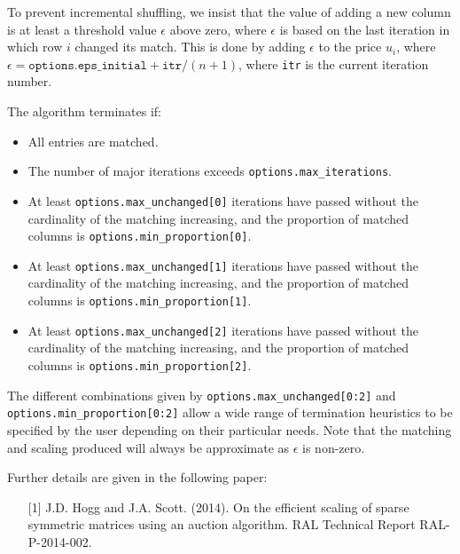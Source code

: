 To prevent incremental shuffling, we insist that the value of
adding a new column is at least a threshold value $\epsilon$ above zero, where
$\epsilon$ is based on the last iteration in which row $i$ changed its match.
This is done by adding $\epsilon$ to the price $u_i$, where $\epsilon = \texttt{options.eps\_initial} + \texttt{itr} / (n+1)$, where \texttt{itr} is the current iteration number.

The algorithm terminates if:
\begin{itemize}
   \item All entries are matched.
   \item The number of major iterations exceeds \texttt{options.max\_iterations}.
   \item At least \texttt{options.max\_unchanged[0]} iterations have passed without the cardinality of the matching increasing, and the proportion of matched columns is \texttt{options.min\_proportion[0]}.
   \item At least \texttt{options.max\_unchanged[1]} iterations have passed without the cardinality of the matching increasing, and the proportion of matched columns is \texttt{options.min\_proportion[1]}.
   \item At least \texttt{options.max\_unchanged[2]} iterations have passed without the cardinality of the matching increasing, and the proportion of matched columns is \texttt{options.min\_proportion[2]}.
\end{itemize}

The different combinations given by \texttt{options.max\_unchanged[0:2]}
and
\texttt{options.min\_proportion[0:2]} allow a wide range of termination
heuristics to be specified by the user depending on their particular needs. Note
that the matching and scaling produced will always be approximate as
$\epsilon$ is non-zero.

\vspace{0.2cm}
\noindent
Further details are given in the following paper:
\vspace{-0.2cm}
\begin{itemize}
   \item[{[1]}] J.D. Hogg and J.A. Scott. (2014). On the efficient scaling of sparse symmetric matrices using an auction algorithm. RAL Technical Report RAL-P-2014-002.
\end{itemize}


